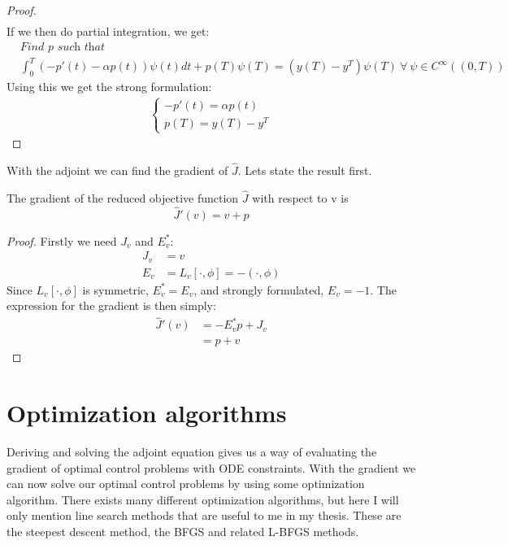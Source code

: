 \begin{proof}
\begin{align*}
\end{align*}
If we then do partial integration, we get:
\begin{align*}
&\textit{Find $p$ such that}\\
&\int_0^T(-p'(t)-\alpha p(t))\psi(t)dt +p(T)\psi(T)= (y(T)-y^T)\psi(T)\ \forall \ \psi \in C^{\infty}((0,T))
\end{align*}
Using this we get the strong formulation:
\begin{align*}
   \left\{
     \begin{array}{lr}
       -p'(t) = \alpha p(t) \\
       p(T) = y(T)-y^T
     \end{array}
   \right.
\end{align*}
\end{proof}
With the adjoint we can find the gradient of $\hat{J}$. Lets state the result first.
\begin{theorem}
The gradient of the reduced objective function $\hat{J}$ with respect to v is 
$$\hat{J}'(v)=v+p$$
\end{theorem}
\begin{proof}
Firstly we need $J_v$ and $E_v^*$:
\begin{align*}
J_v &= v \\
E_v &= L_v[\cdot,\phi] = -(\cdot,\phi)
\end{align*}
Since $L_v[\cdot,\phi]$ is symmetric, $E_v^*=E_v$, and strongly formulated, $E_v=-1$. The expression for the gradient is then simply:
\begin{align*}
\hat{J}'(v)&=-E_v^*p + J_v \\
&= p+v 
\end{align*} 
\end{proof}
\section{Optimization algorithms}
Deriving and solving the adjoint equation gives us a way of evaluating the gradient of optimal control problems with ODE constraints. With the gradient we can now solve our optimal control problems by using some optimization algorithm. There exists many different optimization algorithms, but here I will only mention line search methods that are useful to me in my thesis. These are the steepest descent method, the BFGS and related L-BFGS methods.  
